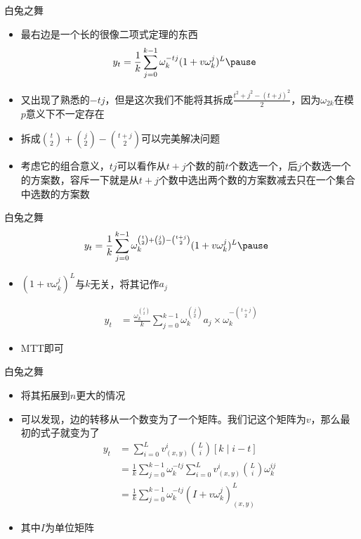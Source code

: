 \documentclass{beamer}
\begin{document}
\begin{frame}{白兔之舞}
    \begin{itemize}
        \item 最右边是一个长的很像二项式定理的东西 \pause
        $$\begin{aligned}
            y_t &= \frac{1}{k}\sum_{j = 0}^{k - 1} \omega_{k}^{-tj} (1 + v\omega_{k}^j)^L \pause
        \end{aligned}$$
        \item 又出现了熟悉的$-tj$，但是这次我们不能将其拆成$\frac{t^2 + j^2 - (t + j)^2}{2}$，因为$\omega_{2k}$在模$p$意义下不一定存在 \pause
        \item 拆成${t\choose 2} + {j\choose 2} - {t + j\choose 2}$可以完美解决问题 \pause
        \item 考虑它的组合意义，$tj$可以看作从$t + j$个数的前$t$个数选一个，后$j$个数选一个的方案数，容斥一下就是从$t + j$个数中选出两个数的方案数减去只在一个集合中选数的方案数
    \end{itemize}
\end{frame}

\begin{frame}{白兔之舞}
    $$\begin{aligned}
        y_t &= \frac{1}{k} \sum_{j = 0}^{k - 1} \omega_{k}^{{t\choose 2} + {j\choose 2} - {t + j\choose 2}} (1 + v\omega_{k}^j)^L \pause
    \end{aligned}$$
    \begin{itemize}
        \item $(1 + v\omega_{k}^j)^L$与$k$无关，将其记作$a_j$ \pause
    \end{itemize}
    $$\begin{aligned}
        y_t &= \frac{\omega_{k}^{t\choose 2}}{k} \sum_{j = 0}^{k - 1} \omega_{k}^{j\choose 2} a_j \times \omega_{k}^{-{t + j\choose 2}}
    \end{aligned}$$
    \begin{itemize}
        \item MTT即可
    \end{itemize}
\end{frame}

\begin{frame}{白兔之舞}
    \begin{itemize}
        \item 将其拓展到$n$更大的情况 \pause
        \item 可以发现，边的转移从一个数变为了一个矩阵。我们记这个矩阵为$v$，那么最初的式子就变为了 \pause
        $$\begin{aligned}
            y_t &= \sum_{i = 0}^L v^i_{(x, y)} {L\choose i} [k\mid i - t]\\
            &= \frac{1}{k}\sum_{j = 0}^{k - 1} \omega_{k}^{-tj} \sum_{i = 0}^L v^i_{(x, y)} {L\choose i} \omega_{k}^{ij}\\
            &= \frac{1}{k}\sum_{j = 0}^{k - 1} \omega_{k}^{-tj} (I + v\omega_{k}^j)^L_{(x, y)}
        \end{aligned}$$
        \item 其中$I$为单位矩阵
    \end{itemize}
\end{frame}
\end{document}
